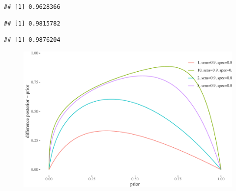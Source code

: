 \documentclass[
  10pt,
  dvipsnames,enabledeprecatedfontcommands]{scrartcl}
\newenvironment{Shaded}{\begin{snugshade}}{\end{snugshade}}
\newcommand{\AttributeTok}[1]{\textcolor[rgb]{0.77,0.63,0.00}{#1}}
\newcommand{\DecValTok}[1]{\textcolor[rgb]{0.00,0.00,0.81}{#1}}
\newcommand{\FloatTok}[1]{\textcolor[rgb]{0.00,0.00,0.81}{#1}}
\newcommand{\FunctionTok}[1]{\textcolor[rgb]{0.00,0.00,0.00}{#1}}
\newcommand{\NormalTok}[1]{#1}
\newcommand{\SpecialCharTok}[1]{\textcolor[rgb]{0.00,0.00,0.00}{#1}}
\begin{document}
\begin{verbatim}
## [1] 0.9628366
\end{verbatim}

\begin{Shaded}
\end{Shaded}

\begin{verbatim}
## [1] 0.9815782
\end{verbatim}

\begin{Shaded}
\end{Shaded}

\begin{verbatim}
## [1] 0.9876204
\end{verbatim}

\begin{figure}


\begin{center}\includegraphics[width=0.9\linewidth]{conjunction-paradox_files/figure-latex/unnamed-chunk-15-1} \end{center}


\end{figure}
\end{document}
